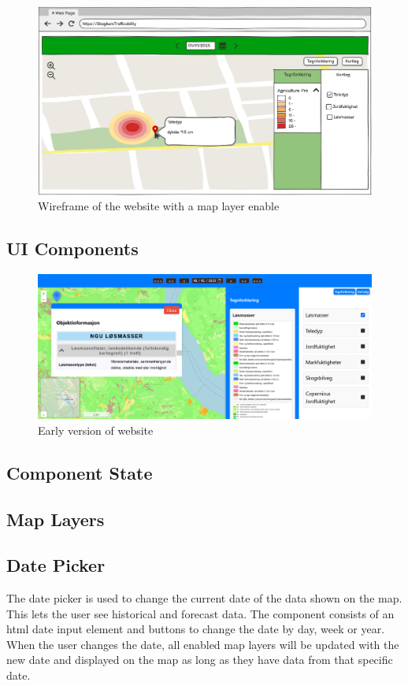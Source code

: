 \begin{figure}[h]
    \centering
    \includegraphics[width=0.6\linewidth]{figures/wireframe_website_sidebars_opened.pdf}
    \caption{Wireframe of the website with a map layer enable}
    \label{fig:wireframe_website_sidebars_opened}
\end{figure}


\subsection{UI Components}
\begin{figure}[h]
    \centering
    \includegraphics[width=1\linewidth]{figures/website_layout_v1.pdf}
    \caption{Early version of website}
    \label{fig:website_layout_v1}
\end{figure}

\subsection{Component State} %

\subsection{Map Layers}

\subsection{Date Picker}
The date picker is used to change the current date of the data shown on the map. This lets the user see historical and forecast data. The component consists of an \acrshort{html} date input element and buttons to change the date by day, week or year. When the user changes the date, all enabled map layers will be updated with the new date and displayed on the map as long as they have data from that specific date.

